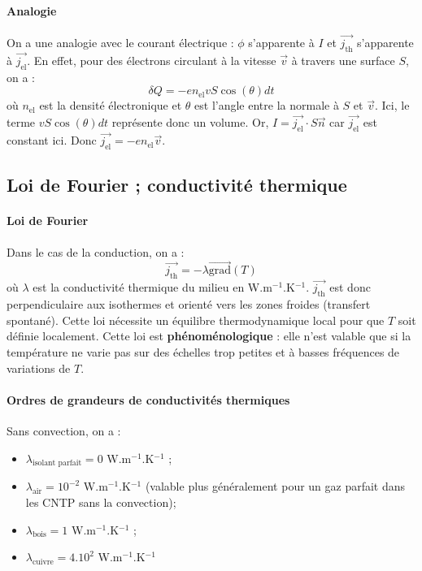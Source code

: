 \documentclass[french]{book}
\theoremstyle{plain}
\theoremstyle{definition}
\theoremstyle{remark}
\newcommand{\inv}{^{-1}}
\newcommand{\grad}{\overrightarrow{\text{grad}}}
\begin{document}
\paragraph{Analogie} On a une analogie avec le courant électrique : $\phi$ s'apparente à $I$ et $\overrightarrow{j_\text{th}}$ s'apparente à $\overrightarrow{j_\text{el}}$. En effet, pour des électrons circulant à la vitesse $\overrightarrow{v}$ à travers une surface $S$, on a : $$\delta Q=-en_\text{el}vS\cos(\theta)dt$$ où $n_\text{el}$ est la densité électronique et $\theta$ est l'angle entre la normale à $S$ et $\overrightarrow{v}$. Ici, le terme $vS\cos(\theta)dt$ représente donc un volume. Or, $I=\overrightarrow{j_\text{el}}\cdot S\overrightarrow{n}$ car $\overrightarrow{j_\text{el}}$ est constant ici. Donc $\overrightarrow{j_\text{el}}=-en_\text{el}\overrightarrow{v}$.
\subsection{Loi de Fourier ; conductivité thermique} 
\paragraph{Loi de Fourier}
Dans le cas de la conduction, on a : $$\overrightarrow{j_\text{th}}=-\lambda\grad(T)$$ où $\lambda$ est la conductivité thermique du milieu en W.m$\inv$.K$\inv$. $\overrightarrow{j_\text{th}}$ est donc perpendiculaire aux isothermes et orienté vers les zones froides (transfert spontané). Cette loi nécessite un équilibre thermodynamique local pour que $T$ soit définie localement. Cette loi est \textbf{phénoménologique} : elle n'est valable que si la température ne varie pas sur des échelles trop petites et à basses fréquences de variations de $T$.
\paragraph{Ordres de grandeurs de conductivités thermiques}
Sans convection, on a : 
\begin{itemize}
	\item $\lambda_\text{isolant parfait}=0$ W.m$\inv$.K$\inv$ ;
	\item $\lambda_\text{air}=10^{-2}$ W.m$\inv$.K$\inv$ (valable plus généralement pour un gaz parfait dans les CNTP sans la convection);
	\item $\lambda_\text{bois}=1$ W.m$\inv$.K$\inv$ ;
	\item $\lambda_\text{cuivre}=4.10^{2}$ W.m$\inv$.K$\inv$
\end{itemize}
\end{document}
